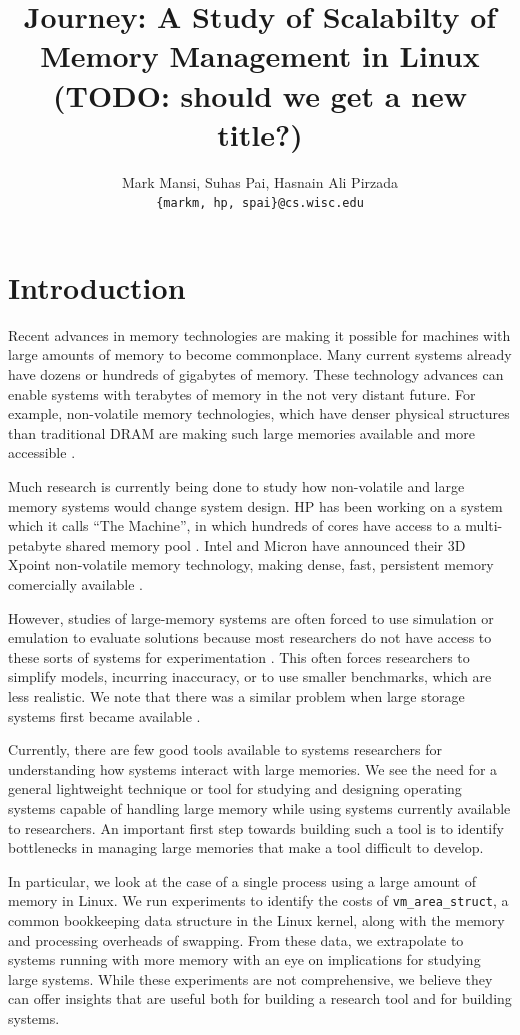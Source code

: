 \documentclass[twocolumn,11pt]{article}
\title{Journey: A Study of Scalabilty of Memory Management in Linux (TODO: should we get a new title?)}
\author{Mark Mansi, Suhas Pai, Hasnain Ali Pirzada\\\texttt{\{markm, hp, spai\}@cs.wisc.edu}}
\date{}
\begin{document}
\maketitle

\section{Introduction}

Recent advances in memory technologies are making it possible for machines with
large amounts of memory to become commonplace. Many current systems already
have dozens or hundreds of gigabytes of memory. These technology advances can
enable systems with terabytes of memory in the not very distant future. For
example, non-volatile memory technologies, which have denser physical
structures than traditional DRAM are making such large memories available and
more accessible \cite{xpoint}.

Much research is currently being done to study how non-volatile and large
memory systems would change system design. HP has been working on a system
which it calls ``The Machine'', in which hundreds of cores have access to a
multi-petabyte shared memory pool \cite{hp_machine}. Intel and
Micron have announced their 3D Xpoint non-volatile memory technology, making
dense, fast, persistent memory comercially available \cite{xpoint}.

However, studies of large-memory systems are often forced to use simulation or
emulation to evaluate solutions because most researchers do not have access to
these sorts of systems for experimentation \cite{quartz}. This often
forces researchers to simplify models, incurring inaccuracy, or to use smaller
benchmarks, which are less realistic. We note that there was a similar problem
when large storage systems first became available \cite{david, exalt}.

Currently, there are few good tools available to systems researchers for
understanding how systems interact with large memories. We see the need for a
general lightweight technique or tool for studying and designing operating
systems capable of handling large memory while using systems currently
available to researchers.  An important first step towards building such a tool
is to identify bottlenecks in managing large memories that make a tool
difficult to develop. 

In particular, we look at the case of a single process using a large amount of
memory in Linux. We run experiments to identify the costs of
\texttt{vm\_area\_struct}, a common bookkeeping data structure in the Linux
kernel, along with the memory and processing overheads of swapping. From these
data, we extrapolate to systems running with more memory with an eye on
implications for studying large systems. While these experiments are not
comprehensive, we believe they can offer insights that are useful both for
building a research tool and for building systems.
\end{document}
